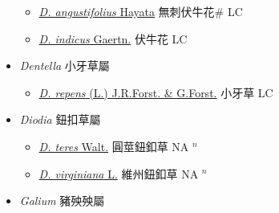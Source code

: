 \begin{itemize}
  \begin{itemize}
        \item[] \href{http://www.theplantlist.org/tpl1.1/search?q=Damnacanthus+angustifolius}{\textit{D. angustifolius} Hayata}   無刺伏牛花\# LC
        \item[] \href{http://www.theplantlist.org/tpl1.1/search?q=Damnacanthus+indicus}{\textit{D. indicus} Gaertn.}   伏牛花 LC
  \end{itemize}
 \item[] \textit{Dentella} 小牙草屬
                    
  \begin{itemize}
        \item[] \href{http://www.theplantlist.org/tpl1.1/search?q=Dentella+repens}{\textit{D. repens} (L.) J.R.Forst. \& G.Forst.}   小牙草 LC
  \end{itemize}
 \item[] \textit{Diodia} 鈕扣草屬
                    
  \begin{itemize}
        \item[] \href{http://www.theplantlist.org/tpl1.1/search?q=Diodia+teres}{\textit{D. teres} Walt.}   圓莖鈕釦草 NA $^n$
        \item[] \href{http://www.theplantlist.org/tpl1.1/search?q=Diodia+virginiana}{\textit{D. virginiana} L.}   維州鈕釦草 NA $^n$
  \end{itemize}
 \item[] \textit{Galium} 豬殃殃屬
                    

\end{itemize}
